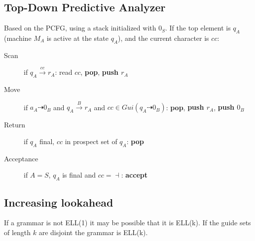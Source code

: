 \subsection{Top-Down Predictive Analyzer}
Based on the PCFG, using a stack initialized with $0_S$. If the top element is $q_A$ (machine $M_A$ is active at the state $q_A$), and the current character is $cc$:
\begin{description}
    \item[Scan] if $q_A \xrightarrow{cc} r_A$: read $cc$, \textbf{pop}, \textbf{push $r_A$}
    \item[Move] if $a_A \dashrightarrow 0_B$ and $q_A \xrightarrow{B} r_A$ and $cc \in Gui(q_A \dashrightarrow 0_B)$: \textbf{pop}, \textbf{push $r_A$}, \textbf{push $0_B$}
    \item[Return] if $q_A$ final, $cc$ in prospect set of $q_A$: \textbf{pop}
    \item[Acceptance] if $A=S$, $q_A$ is final and $cc = \dashv$: \textbf{accept}
\end{description}

\subsection{Increasing lookahead}
If a grammar is not ELL(1) it may be possible that it is ELL(k).
If the guide sets of length $k$ are disjoint the grammar is ELL(k).
